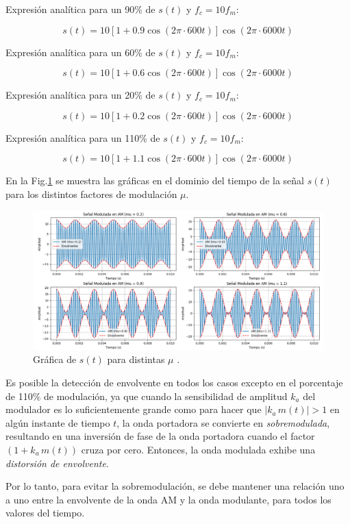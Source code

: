  Expresión analítica para un 90\% de $s(t)$ y $f_c=10 f_m$: 

    \[
        s(t) = 10\left[1+0.9\cos(2\pi \cdot 600t)\right]\cos(2\pi \cdot 6000t)
    \]


 Expresión analítica para un 60\% de $s(t)$ y $f_c=10 f_m$: 

    \[
        s(t) = 10\left[1+0.6\cos(2\pi \cdot 600t)\right]\cos(2\pi \cdot 6000t)
    \]


 Expresión analítica para un 20\% de $s(t)$ y $f_c=10 f_m$: 

    \[
        s(t) = 10\left[1+0.2\cos(2\pi \cdot 600t)\right]\cos(2\pi \cdot 6000t)
    \]

Expresión analítica para un 110\% de $s(t)$ y $f_c=10 f_m$: 

    \[
    s(t) = 10\left[1+1.1\cos(2\pi \cdot 600t)\right]\cos(2\pi \cdot 6000t)
    \]

En la Fig.\ref{fig:actividad_2b} se muestra las gráficas en el dominio del tiempo de la señal $s(t)$ para los distintos factores de modulación $\mu$.

    \begin{figure}[h!]
        \centering
        \includegraphics[width=1\textwidth]{imagenes/Parte_1/Actividad_2/actividad_2b.png}
        \caption{Gráfica de $s(t)$ para distintas $\mu$ .}
        \label{fig:actividad_2b}
    \end{figure}

Es posible la detección de envolvente en todos los casos excepto en el porcentaje de 110\% de modulación, ya que cuando la sensibilidad de amplitud $k_a$ del modulador es lo suficientemente grande como para hacer que $|k_a\,m(t)| > 1$ en algún instante de tiempo $t$, la onda portadora se convierte en \textit{sobremodulada}, resultando en una inversión de fase de la onda portadora cuando el factor $(1 + k_a\,m(t))$ cruza por cero. Entonces, la onda modulada exhibe una \textit{distorsión de envolvente}.

Por lo tanto, para evitar la sobremodulación, se debe mantener una relación uno a uno entre la envolvente de la onda AM y la onda modulante, para todos los valores del tiempo.

    

